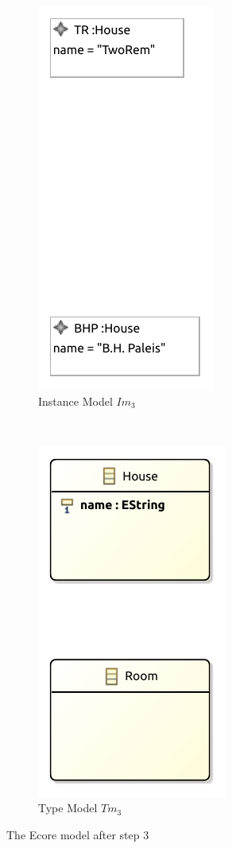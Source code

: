\begin{figure}[p]
    \centering
    \begin{subfigure}{0.98\textwidth}
        \centering
        \includegraphics{images/06_application/instance_model/step03.pdf}
        \caption{Instance Model $Im_3$}
        \label{fig:application:building_the_model:house_names:ecore:instance_model}
    \end{subfigure}
    \\
    \begin{subfigure}{0.98\textwidth}
        \centering
        \includegraphics{images/06_application/type_model/step03.pdf}
        \caption{Type Model $Tm_3$}
        \label{fig:application:building_the_model:house_names:ecore:type_model}
    \end{subfigure}
    \caption{The Ecore model after step 3}
    \label{fig:application:building_the_model:house_names:ecore}
\end{figure}

